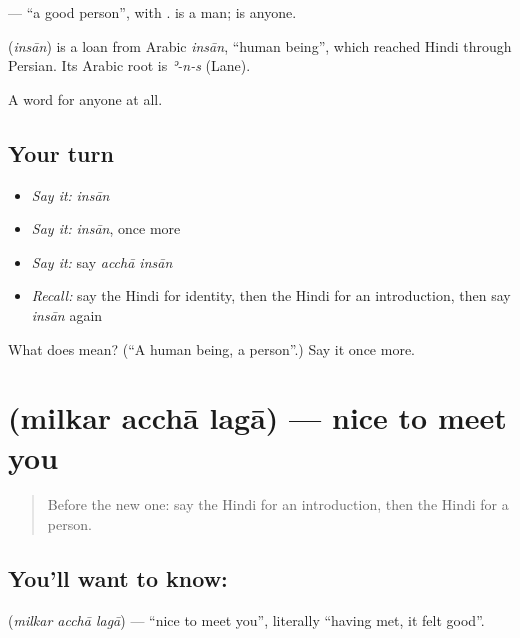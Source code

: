 \textbf{ } — \textquotedblleft{}a good person\textquotedblright{}, with \textbf{}. \textbf{} is a man; \textbf{} is anyone.

\begin{cousinweb}
\textbf{} (\emph{insān}) is a loan from Arabic \emph{insān}, \textquotedblleft{}human being\textquotedblright{}, which reached Hindi through Persian. Its Arabic root is \emph{ʾ-n-s} (Lane).
\end{cousinweb}

\begin{grammarlens}[title={What you've built}]
A word for anyone at all.
\end{grammarlens}

\subsection*{Your turn}
\begin{itemize}
\raggedright
  \item \emph{Say it:} \emph{insān}
  \item \emph{Say it:} \emph{insān}, once more
  \item \emph{Say it:} say \emph{acchā insān}
  \item \emph{Recall:} say the Hindi for identity, then the Hindi for an introduction, then say \emph{insān} again
\end{itemize}

\begin{tcolorbox}[breakable,colback=teal!4,colframe=teal!35!black,title={Before you move on}]
What does  mean? (\textquotedblleft{}A human being, a person\textquotedblright{}.) Say it once more.
\end{tcolorbox}
\section[\texorpdfstring{\hi{मिलकर} \hi{अच्छा} \hi{लगा} (milkar acchā lagā)}{मिलकर अच्छा लगा (milkar acchā lagā)}]{   (milkar acchā lagā) — nice to meet you}

\label{lesson:HI-C120-milkar}



\begin{quote}
Before the new one: say the Hindi for an introduction, then the Hindi for a person.
\end{quote}

\subsection*{You'll want to know:   }
\textbf{  } (\emph{milkar acchā lagā}) — \textquotedblleft{}nice to meet you\textquotedblright{}, literally \textquotedblleft{}having met, it felt good\textquotedblright{}.

